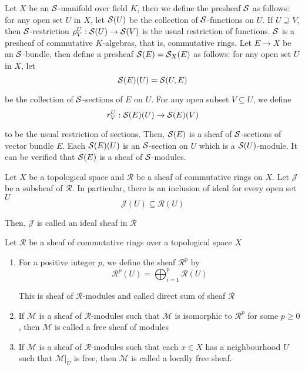 \begin{remark}
	Let $X$ be an $\mathcal{S}$-manifold over field $K$, then we define the presheaf $\mathcal{S}$ as follows: for any open set $U$ in $X$, let $\mathcal{S}(U)$ be the collection of $\mathcal{S}$-functions on $U$. If $U \supseteq V$, then $\mathcal{S}$-restriction $\rho^U_V: \mathcal{S}(U) \to \mathcal{S}(V)$ is the usual restriction of functions. $\mathcal{S}$ is a presheaf of commutative $K$-algebras, that is, commutative rings. Let $E \to X$ be an $\mathcal{S}$-bundle, then define a presheaf $\mathcal{S}(E) = \mathcal{S}_X(E)$ as follows: for any open set $U$ in $X$, let 
	$$
		\mathcal{S}(E)(U) = \mathcal{S}(U, E)
	$$
	
	be the collection of $\mathcal{S}$-sections of $E$ on $U$. For any open subset $V \subseteq U$, we define
	$$
		r^U_V: \mathcal{S}(E)(U) \to \mathcal{S}(E)(V)
	$$
	
	to be the usual restriction of sections. Then, $\mathcal{S}(E)$ is a sheaf of $\mathcal{S}$-sections of vector bundle $E$. Each $\mathcal{S}(E)(U)$ is an $\mathcal{S}$-section on $U$ which is a $\mathcal{S}(U)$-module. It can be verified that $\mathcal{S}(E)$ is a sheaf of $\mathcal{S}$-modules.
\end{remark}

\begin{definition}
	Let $X$ be a topological space and $\mathcal{R}$ be a sheaf of commutative rings on $X$. Let $\mathcal{J}$ be a subsheaf of $\mathcal{R}$. In particular, there is an inclusion of ideal for every open set $U$
	$$
	\mathcal{J}(U) \subseteq \mathcal{R}(U)
	$$
	
	Then, $\mathcal{J}$ is called an ideal sheaf in $\mathcal{R}$
	
\end{definition}

\begin{definition}
	Let $\mathcal{R}$ be a sheaf of commutative rings over a topological space $X$
	\begin{enumerate}
		\item For a positive integer $p$, we define the sheaf $\mathcal{R}^p$ by
		$$
		\mathcal{R}^p(U) = \bigoplus_{i=1}^p \mathcal{R}(U)
		$$
		
		This is sheaf of $\mathcal{R}$-modules and called direct sum of sheaf $\mathcal{R}$
		
		\item If $\mathcal{M}$ is a sheaf of $\mathcal{R}$-modules such that $\mathcal{M}$ is isomorphic to $\mathcal{R}^p$ for some $p \geq 0$, then $\mathcal{M}$ is called a free sheaf of modules
		
		\item If $\mathcal{M}$ is a sheaf of $\mathcal{R}$-modules such that each $x \in X$ has a neighbourhood $U$ such that $\mathcal{M}\vert_U$ is free, then $\mathcal{M}$ is called a locally free sheaf.
	\end{enumerate}
\end{definition}

